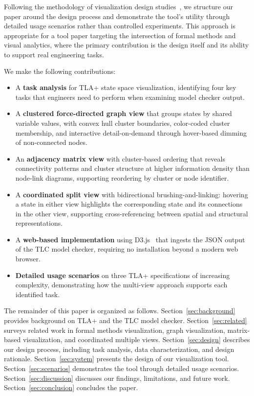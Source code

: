 \documentclass[conference]{IEEEtran}
\begin{document}
Following the methodology of visualization design studies~\cite{sedlmair2012design}, we structure our paper around the design process and demonstrate the tool's utility through detailed usage scenarios rather than controlled experiments. This approach is appropriate for a tool paper targeting the intersection of formal methods and visual analytics, where the primary contribution is the design itself and its ability to support real engineering tasks.

We make the following contributions:

\begin{itemize}
\item A \textbf{task analysis} for TLA+ state space visualization, identifying four key tasks that engineers need to perform when examining model checker output.
\item A \textbf{clustered force-directed graph view} that groups states by shared variable values, with convex hull cluster boundaries, color-coded cluster membership, and interactive detail-on-demand through hover-based dimming of non-connected nodes.
\item An \textbf{adjacency matrix view} with cluster-based ordering that reveals connectivity patterns and cluster structure at higher information density than node-link diagrams, supporting reordering by cluster or node identifier.
\item A \textbf{coordinated split view} with bidirectional brushing-and-linking: hovering a state in either view highlights the corresponding state and its connections in the other view, supporting cross-referencing between spatial and structural representations.
\item A \textbf{web-based implementation} using D3.js~\cite{bostock2011d3} that ingests the JSON output of the TLC model checker, requiring no installation beyond a modern web browser.
\item \textbf{Detailed usage scenarios} on three TLA+ specifications of increasing complexity, demonstrating how the multi-view approach supports each identified task.
\end{itemize}

The remainder of this paper is organized as follows. Section~\ref{sec:background} provides background on TLA+ and the TLC model checker. Section~\ref{sec:related} surveys related work in formal methods visualization, graph visualization, matrix-based visualization, and coordinated multiple views. Section~\ref{sec:design} describes our design process, including task analysis, data characterization, and design rationale. Section~\ref{sec:system} presents the design of our visualization tool. Section~\ref{sec:scenarios} demonstrates the tool through detailed usage scenarios. Section~\ref{sec:discussion} discusses our findings, limitations, and future work. Section~\ref{sec:conclusion} concludes the paper.
\end{document}
